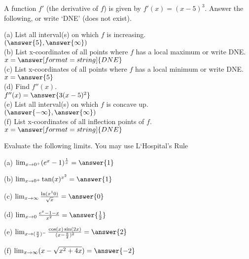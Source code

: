 \documentclass{ximera}
\begin{document}
\begin{exercise}
A function $f'$ (the derivative of $f$) is given by $f'(x)=(x-5)^3$. Answer the following, or write  `DNE' (does not exist).

(a) List all interval(s) on which $f$ is increasing.\\
$(\answer{5},\answer{\infty})$\\

(b) List x-coordinates of all points where $f$ has a local maximum or write DNE. \\
$x=\answer[format=string]{DNE}$\\

(c)  List x-coordinates of all points where $f$ has a local minimum or write DNE.\\

$x=\answer{5}$\\

(d) Find  $f''(x)$.\\

$f''(x)=\answer{3(x-5)^2}$\\

(e) List all interval(s) on which $f$ is concave up.\\

$(\answer{-\infty},\answer{\infty})$\\

(f) List x-coordinates of all inflection points of $f$.\\

$x=\answer[format=string]{DNE}$\\

\end{exercise}

\begin{exercise}
Evaluate the following limits.  You may use L`Hospital's Rule

(a) $\lim_{x\to 0^+} (e^x-1)^\frac{1}{x}=\answer{1}$

(b) $\lim_{x\to 0^+} \tan(x)^{x^2}=\answer{1}$

(c) $\lim_{x\to \infty} \frac{\ln(x^10)}{\sqrt{x}}=\answer{0}$

(d) $\lim_{x\to 0} \frac{e^x-1-x}{x^2}=\answer{\frac{1}{2}}$

(e) $\lim_{x\to (\frac{\pi}{2})^-} \frac{\cos(x)\sin(2x)}{(x-\frac{\pi}{2})^2}=\answer{2}$

(f) $\lim_{x\to\infty} (x-\sqrt{x^2+4x})=\answer{-2}$
\end{exercise}
\end{document}
